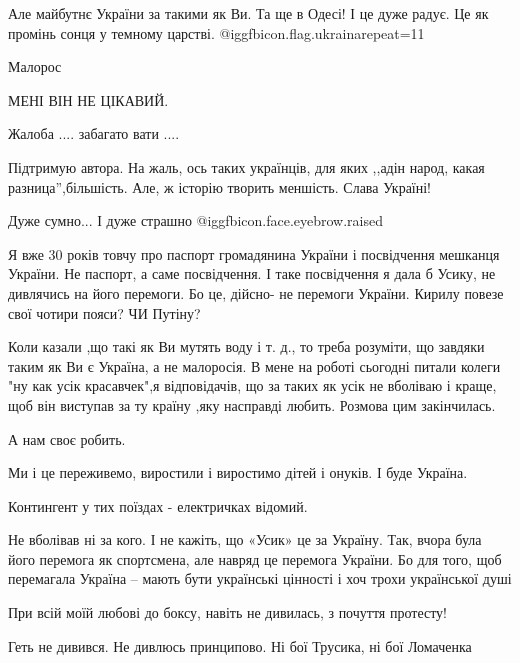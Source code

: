 \begin{itemize}

Але майбутнє України за такими як Ви. Та ще в Одесі! І це дуже радує. Це як
промінь сонця у темному царстві. 
@igg{fbicon.flag.ukraina}{repeat=11}

Малорос

МЕНІ ВІН НЕ ЦІКАВИЙ.

Жалоба .... забагато вати ....


Підтримую автора. На жаль, ось таких українців, для яких ,,адін народ, какая
разница'',більшість. Але, ж історію творить меншість. Слава Україні!

Дуже сумно...
І дуже страшно  @igg{fbicon.face.eyebrow.raised} 


Я вже 30 років товчу про паспорт громадянина України і посвідчення мешканця
України. Не паспорт, а саме посвідчення. І таке посвідчення я дала б Усику, не
дивлячись на його перемоги. Бо це, дійсно- не перемоги України. Кирилу повезе
свої чотири пояси? ЧИ Путіну?



Коли казали ,що такі як Ви мутять воду і т. д., то треба розуміти, що завдяки
таким як Ви є Україна, а не малоросія. В мене на роботі сьогодні питали колеги
"ну как усік красавчек",я відповідачів, що за таких як усік не вболіваю і
краще, щоб він виступав за ту країну ,яку насправді любить. Розмова цим
закінчилась.



А нам своє робить.

Ми і це переживемо, виростили і виростимо дітей і онуків. І буде Україна.

Контингент у тих поїздах - електричках відомий.

Не вболівав ні за кого.
І не кажіть, що «Усик» це за Україну.
Так, вчора була його перемога як спортсмена, але навряд це перемога України.
Бо для того, щоб перемагала Україна – мають бути українські цінності і хоч трохи української душі

При всій моїй любові до боксу, навіть не дивилась, з почуття протесту!

Геть не дивився. Не дивлюсь принципово. Ні бої Трусика, ні бої Ломаченка



\end{itemize}
